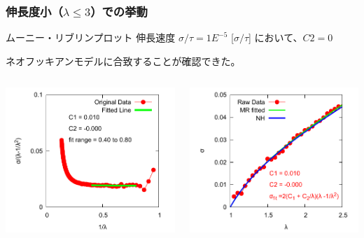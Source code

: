 \documentclass[11pt, dvipdfmx]{beamer}
\begin{document}
\begin{frame}
\frametitle{伸長度小（$\lambda \leq 3$）での挙動}

\small
\begin{alertblock}{ムーニー・リブリンプロット}
伸長速度 $\sigma/\tau = 1E^{-5}$ [$\sigma/\tau$] において、$C2=0$

ネオフッキアンモデルに合致することが確認できた。
\end{alertblock}

\begin{columns}[T, totalwidth=0.96\linewidth]

\includegraphics[width=\columnwidth]{./fig/MR_1e-5.pdf}

\includegraphics[width=\columnwidth]{./fig/SS_w_MR_1e-5.pdf}
\end{columns}
\end{frame}
\end{document}
